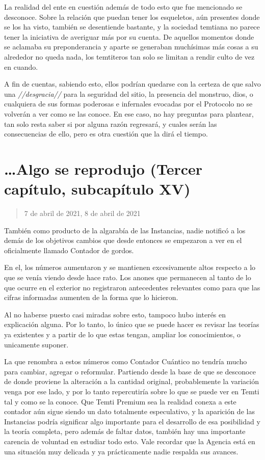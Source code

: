 \documentclass[
  spanish,
]{book}
\begin{document}
La realidad del ente en cuestión además de todo esto que fue mencionado se desconoce. Sobre la relación que puedan tener los esqueletos, aún presentes donde se los ha visto, también se desentiende bastante, y la sociedad temtiana no parece tener la iniciativa de averiguar más por su cuenta. De aquellos momentos donde se aclamaba su preponderancia y aparte se generaban muchísimas más cosas a su alrededor no queda nada, los temtiteros tan solo se limitan a rendir culto de vez en cuando.

A fin de cuentas, sabiendo esto, ellos podrían quedarse con la certeza de que salvo una \emph{//desgracia//} para la seguridad del sitio, la presencia del monstruo, dios, o cualquiera de sus formas poderosas e infernales evocadas por el Protocolo no se volverán a ver como se las conoce. En ese caso, no hay preguntas para plantear, tan solo resta saber si por alguna razón regresará, y cuales serán las consecuencias de ello, pero es otra cuestión que la dirá el tiempo.

\hypertarget{algo-se-reprodujo-tercer-capuxedtulo-subcapuxedtulo-xv}{%
\section{\ldots Algo se reprodujo (Tercer capítulo, subcapítulo XV)}\label{algo-se-reprodujo-tercer-capuxedtulo-subcapuxedtulo-xv}}

\begin{quote}
7 de abril de 2021, 8 de abril de 2021
\end{quote}

También como producto de la algarabía de las Instancias, nadie notificó a los demás de los objetivos cambios que desde entonces se empezaron a ver en el oficialmente llamado Contador de gordos.

En el, los números aumentaron y se mantienen excesivamente altos respecto a lo que se venía viendo desde hace rato. Los anones que permanecen al tanto de lo que ocurre en el exterior no registraron antecedentes relevantes como para que las cifras informadas aumenten de la forma que lo hicieron.

Al no haberse puesto casi miradas sobre esto, tampoco hubo interés en explicación alguna. Por lo tanto, lo único que se puede hacer es revisar las teorías ya existentes y a partir de lo que estas tengan, ampliar los conocimientos, o unicamente suponer.

La que renombra a estos números como Contador Cuántico no tendría mucho para cambiar, agregar o reformular. Partiendo desde la base de que se desconoce de donde proviene la alteración a la cantidad original, probablemente la variación venga por ese lado, y por lo tanto repercutiría sobre lo que se puede ver en Temti tal y como se la conoce. Que Temti Premium sea la realidad conexa a este contador aún sigue siendo un dato totalmente especulativo, y la aparición de las Instancias podría significar algo importante para el desarrollo de esa posibilidad y la teoría completa, pero además de faltar datos, también hay una importante carencia de voluntad en estudiar todo esto. Vale recordar que la Agencia está en una situación muy delicada y ya prácticamente nadie respalda sus avances.
\end{document}

